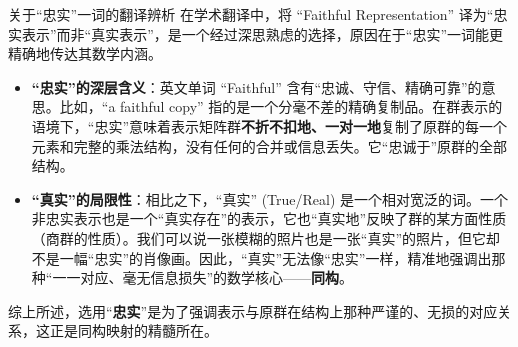 \begin{note}{关于“忠实”一词的翻译辨析}
    在学术翻译中，将 “Faithful Representation” 译为“忠实表示”而非“真实表示”，是一个经过深思熟虑的选择，原因在于“忠实”一词能更精确地传达其数学内涵。
    
    \begin{itemize}
        \item \textbf{“忠实”的深层含义}：英文单词 “Faithful” 含有“忠诚、守信、精确可靠”的意思。比如，“a faithful copy” 指的是一个分毫不差的精确复制品。在群表示的语境下，“忠实”意味着表示矩阵群\textbf{不折不扣地、一对一地}复制了原群的每一个元素和完整的乘法结构，没有任何的合并或信息丢失。它“忠诚于”原群的全部结构。
        
        \item \textbf{“真实”的局限性}：相比之下，“真实” (True/Real) 是一个相对宽泛的词。一个非忠实表示也是一个“真实存在”的表示，它也“真实地”反映了群的某方面性质（商群的性质）。我们可以说一张模糊的照片也是一张“真实”的照片，但它却不是一幅“忠实”的肖像画。因此，“真实”无法像“忠实”一样，精准地强调出那种“一一对应、毫无信息损失”的数学核心——\textbf{同构}。
    \end{itemize}
    综上所述，选用“\textbf{忠实}”是为了强调表示与原群在结构上那种严谨的、无损的对应关系，这正是同构映射的精髓所在。
\end{note}

